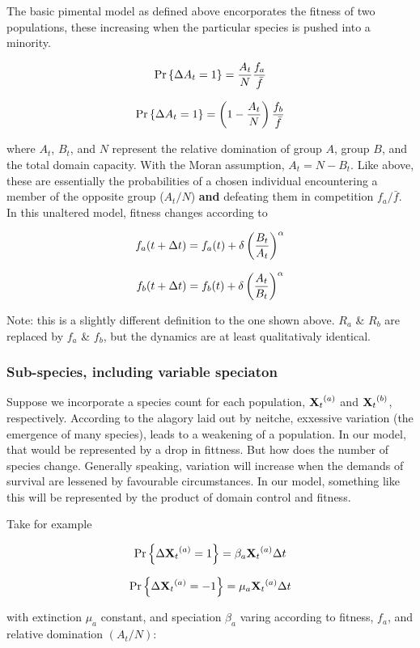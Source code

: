 The basic pimental model as defined above encorporates the fitness of two populations, these increasing when the particular species is pushed into a minority. 

$${\text{Pr}\left\{\Delta A_t = 1\right\}} = \frac{A_t}{N} \frac{f_a}{\bar f}$$

$${\text{Pr}\left\{\Delta A_t = 1\right\}} =\left( 1 - \frac{A_t}{N}\right) \frac{f_b}{\bar f}$$




where $A_t$, $B_t$, and $N$ represent the relative domination of group $A$, group $B$, and the total domain capacity. With the Moran assumption, $A_t = N - B_t$. Like above, these are essentially the probabilities of a chosen individual encountering a member of the opposite group ($A_t/N$) \textbf{and} defeating them in competition ${f_a}/{\bar f}$. In this unaltered model, fitness changes according to

$$f_a(t+\Delta t) = f_a(t) + \delta \left(\frac{B_t}{A_t}\right)^\alpha$$

$$f_b(t+\Delta t) = f_b(t) + \delta \left(\frac{A_t}{B_t}\right)^\alpha$$

\noindent
Note: this is a slightly different definition to the one shown above. $R_a$ \& $R_b$ are replaced by $f_a$ \& $f_b$, but the dynamics are at least qualitativaly identical. 

\subsubsection*{Sub-species, including variable speciaton}

Suppose we incorporate a species count for each population, ${{\bf X}_t}^{(a)}$ and ${{\bf X}_t}^{(b)}$, respectively. According to the alagory laid out by neitche, exxessive variation (the emergence of many species), leads to a weakening of a population. In our model, that would be represented by a drop in fittness. But how does the number of species change. Generally speaking, variation will increase when the demands of survival are lessened by favourable circumstances. In our model, something like this will be represented by the product of domain control and fitness.\par 
Take for example

$${\text{Pr}\left\{\Delta {{\bf X}_t}^{(a)} = 1\right\}}  = \beta_a{{\bf X}_t}^{(a)} \Delta t$$

$${\text{Pr}\left\{\Delta {{\bf X}_t}^{(a)} = -1\right\}}  = \mu_a{{\bf X}_t}^{(a)} \Delta t$$

\noindent
with extinction $\mu_a$ constant, and speciation $\beta_a$ varing according to fitness, $f_a$, and relative domination $(A_t / N)$:

